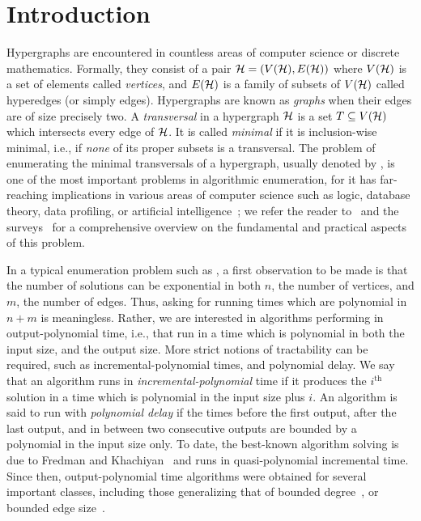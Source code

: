 
\section{Introduction}

Hypergraphs are encountered in countless areas of computer science or discrete mathematics.
Formally, they consist of a pair $\mathcal{H}=(V(\mathcal{H}),E(\mathcal{H}))$ where $V(\mathcal{H})$ is a set of elements called \emph{vertices}, and $E(\mathcal{H})$ is a family of subsets of $V(\mathcal{H})$ called hyperedges (or simply edges).
Hypergraphs are known as \emph{graphs} when their edges are of size precisely two.
A \emph{transversal} in a hypergraph $\mathcal{H}$ is a set $T\subseteq V(\mathcal{H})$ which intersects every edge of $\mathcal{H}$.
It is called \emph{minimal} if it is inclusion-wise minimal, i.e., if \textit{none} of its proper subsets is a transversal.
%
The problem of enumerating the minimal transversals of a hypergraph, usually denoted by \transenum{}, is one of the most important problems in algorithmic enumeration, for it has far-reaching implications in various areas of computer science such as logic, database theory, data profiling, or
artificial intelligence~\cite{kavvadias1993horn,eiter1995identifying,gunopulos1997data,blasius2022efficiently}; we refer the reader to~\cite{eiter1995identifying} and the surveys~\cite{eiter2008computational,gainer2017minimal} for a comprehensive overview on the fundamental and practical aspects of this problem.

In a typical enumeration problem such as \transenum{}, a first observation to be made is that the number of solutions can be exponential in both $n$, the number of vertices, and $m$, the number of edges.
Thus, asking for running times which are polynomial in $n+m$ is meaningless.
Rather, we are interested in algorithms performing in output-polynomial time, i.e., that run in a time which is polynomial in both the input size, and the output size.
More strict notions of tractability can be required, such as incremental-polynomial times, and polynomial delay.
We say that an algorithm runs in \emph{incremental-polynomial} time if it produces the $i^\text{th}$ solution in a time which is polynomial in the input size plus $i$.
An algorithm is said to run with \emph{polynomial delay} if the times before the first output, after the last output, and in between two consecutive outputs are bounded by a polynomial in the input size only.
To date, the best-known algorithm solving \transenum{} is due to Fredman and Khachiyan~\cite{fredman1996complexity} and runs in quasi-polynomial incremental time. 
Since then, output-polynomial time algorithms were obtained for several important classes, including those generalizing that of bounded degree~\cite{eiter2003new}, or bounded edge size~\cite{khachiyan2007conformality}.

